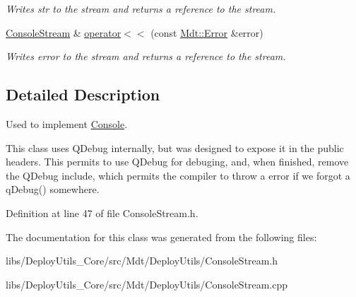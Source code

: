 \begin{DoxyCompactItemize}
\begin{DoxyCompactList}\small\item\em Writes {\itshape str} to the stream and returns a reference to the stream. \end{DoxyCompactList}\item 
\hyperlink{class_mdt_1_1_deploy_utils_1_1_console_stream}{Console\+Stream} \& \hyperlink{class_mdt_1_1_deploy_utils_1_1_console_stream_ae8b85dd69639169c3e60002a42f38236}{operator$<$$<$} (const \hyperlink{class_mdt_1_1_error}{Mdt\+::\+Error} \&error)\hypertarget{class_mdt_1_1_deploy_utils_1_1_console_stream_ae8b85dd69639169c3e60002a42f38236}{}\label{class_mdt_1_1_deploy_utils_1_1_console_stream_ae8b85dd69639169c3e60002a42f38236}

\begin{DoxyCompactList}\small\item\em Writes {\itshape error} to the stream and returns a reference to the stream. \end{DoxyCompactList}\end{DoxyCompactItemize}


\subsection{Detailed Description}
Used to implement \hyperlink{class_mdt_1_1_deploy_utils_1_1_console}{Console}. 

This class uses Q\+Debug internally, but was designed to expose it in the public headers. This permits to use Q\+Debug for debuging, and, when finished, remove the Q\+Debug include, which permits the compiler to throw a error if we forgot a q\+Debug() somewhere. 

Definition at line 47 of file Console\+Stream.\+h.



The documentation for this class was generated from the following files\+:\begin{DoxyCompactItemize}
\item 
libs/\+Deploy\+Utils\+\_\+\+Core/src/\+Mdt/\+Deploy\+Utils/Console\+Stream.\+h\item 
libs/\+Deploy\+Utils\+\_\+\+Core/src/\+Mdt/\+Deploy\+Utils/Console\+Stream.\+cpp\end{DoxyCompactItemize}
